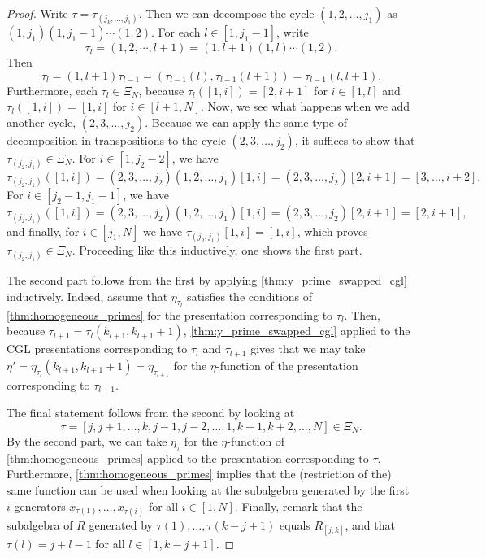 \begin{proof}

	Write $\tau = \tau_{(j_k, \dots, j_1)}$. Then we can decompose the cycle $(1,2,\dots,
		j_1)$ as $(1, j_1)(1, j_1 - 1)\cdots (1, 2)$. For each $l \in [1, j_1 - 1]$, write
	\begin{equation*}
		\tau_l = (1,2,\cdots, l+1) = (1, l+1) (1, l) \cdots (1, 2).
	\end{equation*}
	Then
	\begin{equation*}
		\tau_l = (1, l+1)\tau_{l-1} = (\tau_{l-1}(l), \tau_{l-1}(l+1)) = \tau_{l-1}(l, l+1).
	\end{equation*}
	Furthermore, each $\tau_l \in \Xi_N$, because $\tau_l ([1, i]) = [2, i+1]$ for $i \in
		[1, l]$ and $\tau_l ([1, i]) = [1, i]$ for $i \in [l+1, N]$. Now, we see what happens
	when we add another cycle, $(2,3,\dots, j_2)$. Because we can apply the same type of
	decomposition in transpositions to the cycle $(2,3,\dots, j_2)$, it suffices to show
	that $\tau_{(j_2, j_1)} \in \Xi_N$. For $i \in [1, j_2 - 2]$, we have
	\begin{equation*}
		\tau_{(j_2, j_1)}([1, i]) = (2,3, \dots, j_2)(1,2,\dots,j_1)[1, i]= (2,3,\dots,j_2)[2, i+1] = [3,\dots,i+2].
	\end{equation*}
	For $i \in [j_2 - 1, j_1 -1]$, we have
	\begin{equation*}
		\tau_{(j_2,j_1)}([1, i]) = (2,3,\dots, j_2)(1,2, \dots, j_1)[1, i] = (2,3,\dots,j_2)[2,i+1] = [2, i+1],
	\end{equation*}
	and finally, for $i \in [j_1, N]$ we have $\tau_{(j_2,j_1)}[1,i] = [1, i]$, which proves $\tau_{(j_2, j_1)} \in \Xi_N$. Proceeding like this inductively, one shows the first part.

	The second part follows from the first by applying \cref{thm:y_prime_swapped_cgl}
	inductively. Indeed, assume that $\eta_{\tau_l}$ satisfies the conditions of
	\cref{thm:homogeneous_primes} for the presentation corresponding to $\tau_l$. Then,
	because $\tau_{l+1} = \tau_l (k_{l+1}, k_{l+1} + 1)$, \cref{thm:y_prime_swapped_cgl}
	applied to the CGL presentations corresponding to $\tau_{l}$ and $\tau_{l+1}$ gives
	that we may take $\eta' = \eta_{\tau_l}(k_{l+1}, k_{l+1}+1) = \eta_{\tau_{l+1}}$ for
	the $\eta$-function of the presentation corresponding to $\tau_{l+1}$.

	The final statement follows from the second by looking at
	\begin{equation*}
		\tau = [j, j+1, \dots, k, j-1,j-2, \dots , 1, k+1, k+2, \dots, N] \in \Xi_N.
	\end{equation*}
	By the second part, we can take $\eta_\tau$ for the $\eta$-function of
	\cref{thm:homogeneous_primes} applied to the presentation corresponding to $\tau$.
	Furthermore, \cref{thm:homogeneous_primes} implies that the (restriction of the) same
	function can be used when looking at the subalgebra generated by the first $i$
	generators $x_{\tau(1)}, \dots, x_{\tau(i)}$ for all $i \in [1, N]$. Finally, remark
	that the subalgebra of $R$ generated by $\tau(1), \dots, \tau(k - j + 1)$ equals
	$R_{[j, k]}$, and that $\tau(l) = j + l - 1$ for all $l \in [1, k- j + 1]$.
\end{proof}

